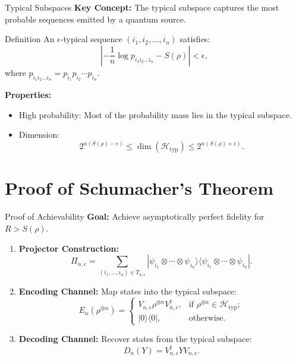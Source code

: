 \begin{frame}{Typical Subspaces}
    \textbf{Key Concept:} The typical subspace captures the most probable sequences emitted by a quantum source.
    \begin{block}{Definition}
        An \(\epsilon\)-typical sequence \((i_1, i_2, \dots, i_n)\) satisfies:
        \[
        \left| -\frac{1}{n} \log p_{i_1 i_2 \dots i_n} - S(\rho) \right| < \epsilon,
        \]
        where \( p_{i_1 i_2 \dots i_n} = p_{i_1} p_{i_2} \cdots p_{i_n} \).
    \end{block}
    \textbf{Properties:}
    \begin{itemize}
        \item High probability: Most of the probability mass lies in the typical subspace.
        \item Dimension: 
        \[
        2^{n(S(\rho) - \epsilon)} \leq \dim(\mathcal{H}_{\text{typ}}) \leq 2^{n(S(\rho) + \epsilon)}.
        \]
    \end{itemize}
\end{frame}

\section{Proof of Schumacher's Theorem}

\begin{frame}{Proof of Achievability}
    \textbf{Goal:} Achieve asymptotically perfect fidelity for \( R > S(\rho) \).
    \begin{enumerate}
        \item \textbf{Projector Construction:}
        \[
        \Pi_{n, \epsilon} = \sum_{(i_1, \dots, i_n) \in T_{n, \epsilon}} |\psi_{i_1} \otimes \cdots \otimes \psi_{i_n}\rangle \langle \psi_{i_1} \otimes \cdots \otimes \psi_{i_n}|.
        \]
        \item \textbf{Encoding Channel:} Map states into the typical subspace:
        \[
        E_n(\rho^{\otimes n}) = 
        \begin{cases}
            V_{n, \epsilon} \rho^{\otimes n} V_{n, \epsilon}^\dagger, & \text{if } \rho^{\otimes n} \in \mathcal{H}_{\text{typ}}; \\
            |0\rangle\langle 0|, & \text{otherwise.}
        \end{cases}
        \]
        \item \textbf{Decoding Channel:} Recover states from the typical subspace:
        \[
        D_n(Y) = V_{n, \epsilon}^\dagger Y V_{n, \epsilon}.
        \]
    \end{enumerate}
\end{frame}

